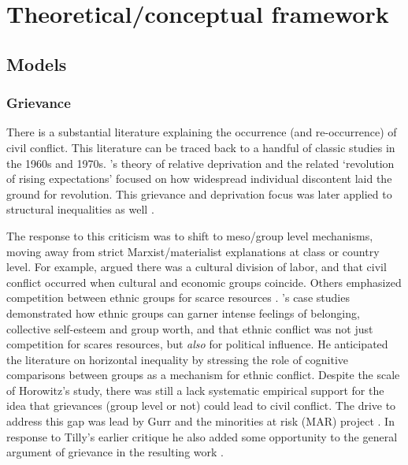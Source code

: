 \documentclass[12pt]{article}
\begin{document}
\section{Theoretical/conceptual framework}
\label{Theoretical/conceptual framework}

\subsection{Models} \label{Models}

\subsubsection{Grievance} \label{Grievance}

There is a substantial literature explaining the occurrence (and re-occurrence)
of civil conflict. This literature can be traced back to a handful of classic
studies in the 1960s and 1970s. \citet{GurrTedRobert1970Wmr}'s theory of
relative deprivation and the related `revolution of rising expectations'
\citep{Davies_1962} focused on how widespread individual discontent laid the
ground for revolution. This grievance and deprivation focus was later applied to
structural inequalities as well \citep{Muller_1985, Muller_1987,
ScottJamesC1977TMEo}. 

The response to this criticism was to shift to meso/group level mechanisms,
moving away from strict Marxist/materialist explanations at class or country
level. For example, \citet{Hechter_1978} argued there was a cultural division of
labor, and that civil conflict occurred when cultural and economic groups
coincide. Others emphasized competition between ethnic groups for scarce
resources \citep{barth1969}. \citet{Horowitz1985}'s case studies demonstrated
how ethnic groups can garner intense feelings of belonging, collective
self-esteem and group worth, and that ethnic conflict was not just competition
for scares resources, but \textit{also} for political influence. He anticipated
the literature on horizontal inequality by stressing the role of cognitive
comparisons between groups as a mechanism for ethnic conflict. Despite the scale
of Horowitz's study, there was still a lack systematic empirical support for the
idea that grievances (group level or not) could lead to civil conflict. The
drive to address this gap was lead by Gurr and the minorities at risk (MAR)
project \citet{GurrTedRobert1993Mar:}. In response to Tilly's earlier
critique he also added some opportunity to the general argument of grievance in
the resulting work \citep{Gurr_1993}. 
\end{document}
